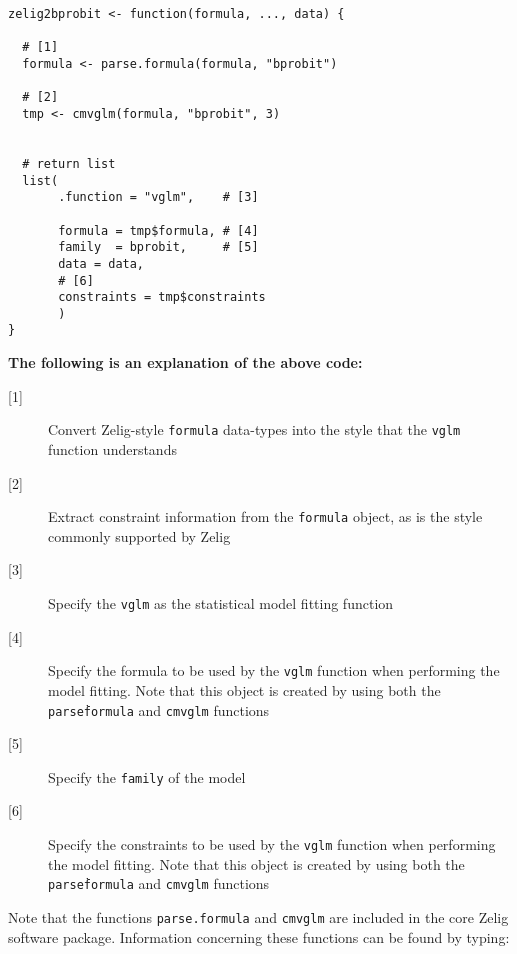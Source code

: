 \documentclass{article}
\newcommand{\code}[1]{{\tt #1}}
\begin{document}
%

\begin{verbatim}
zelig2bprobit <- function(formula, ..., data) {

  # [1]
  formula <- parse.formula(formula, "bprobit")
  
  # [2]
  tmp <- cmvglm(formula, "bprobit", 3)

  
  # return list
  list(
       .function = "vglm",    # [3]
       
       formula = tmp$formula, # [4]
       family  = bprobit,     # [5]
       data = data,
       # [6]
       constraints = tmp$constraints
       )
}
\end{verbatim}

{\noindent \bf The following is an explanation of the above code:}

%

\begin{description}

	\item[{[1]}] Convert Zelig-style \code{formula} data-types into the style that the \code{vglm} function understands

	\item[{[2]}] Extract constraint information from the \code{formula} object, as is the style commonly supported by Zelig

	\item[{[3]}] Specify the \code{vglm} as the statistical model fitting function

	\item[{[4]}] Specify the formula to be used by the \code{vglm} function when performing the model fitting. Note that this object is created by using both the \code{parse\.formula} and \code{cmvglm} functions 

	\item[{[5]}] Specify the \code{family} of the model

	\item[{[6]}] Specify the constraints to be used by the \code{vglm} function when performing the model fitting. Note that this object is created by using both the \code{parse\.formula} and \code{cmvglm} functions

\end{description}

%

\noindent Note that the functions \code{parse.formula} and \code{cmvglm} are included in the core Zelig software package. Information concerning these functions can be found by typing:
\end{document}
